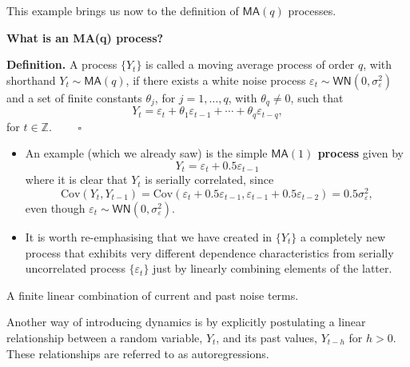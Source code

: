 \documentclass[
  letterpaper,
  DIV=11,
  numbers=noendperiod]{scrartcl}
\newcommand{\slidelabel}[1]{{\color{embernavy}\bfseries\large #1\par\vspace{5pt}}}
\newenvironment{slidefooter}{%
  \par\vspace{7pt}{\color{emberrule}\rule{\linewidth}{0.4pt}}\par\vspace{4pt}%
  \color{emberamber}\itshape\small}{\par}
\begin{document}
This example brings us now to the definition of \(\mathsf{MA}(q)\)
processes.

\begin{slidebox}

\slidelabel{What is an MA(q) process?}

\textbf{Definition.} A process \(\{Y_t\}\) is called a moving average
process of order \(q\), with shorthand \(Y_t \sim \mathsf{MA}(q)\), if
there exists a white noise process
\(\varepsilon_t \sim \mathsf{WN}\left(0, \sigma_\varepsilon^2\right)\)
and a set of finite constants \(\theta_j\), for \(j = 1, \ldots, q\),
with \(\theta_q \neq 0\), such that
\[Y_t = \varepsilon_t + \theta_1\varepsilon_{t-1} + \cdots + \theta_q\varepsilon_{t-q},\]
for \(t \in \mathbb{Z}\). \(\qquad\square\)

\begin{itemize}
\item
  An example (which we already saw) is the simple
  \textbf{\(\mathsf{MA}(1)\) process} given by
  \[Y_t = \varepsilon_t + 0.5\varepsilon_{t-1}\] where it is clear that
  \(Y_t\) is serially correlated, since
  \[\text{Cov}(Y_t, Y_{t-1}) = \text{Cov}(\varepsilon_t + 0.5\varepsilon_{t-1}, \varepsilon_{t-1} + 0.5\varepsilon_{t-2}) = 0.5\sigma_\varepsilon^2,\]
  even though
  \(\varepsilon_t \sim \mathsf{WN}\left(0, \sigma_\varepsilon^2\right)\).
\item
  It is worth re-emphasising that we have created in \(\{Y_t\}\) a
  completely new process that exhibits very different dependence
  characteristics from serially uncorrelated process
  \(\{\varepsilon_t\}\) just by linearly combining elements of the
  latter.
\end{itemize}

\begin{slidefooter}

A finite linear combination of current and past noise terms.

\end{slidefooter}

\end{slidebox}

Another way of introducing dynamics is by explicitly postulating a
linear relationship between a random variable, \(Y_t\), and its past
values, \(Y_{t-h}\) for \(h > 0\). These relationships are referred to
as autoregressions.
\end{document}
